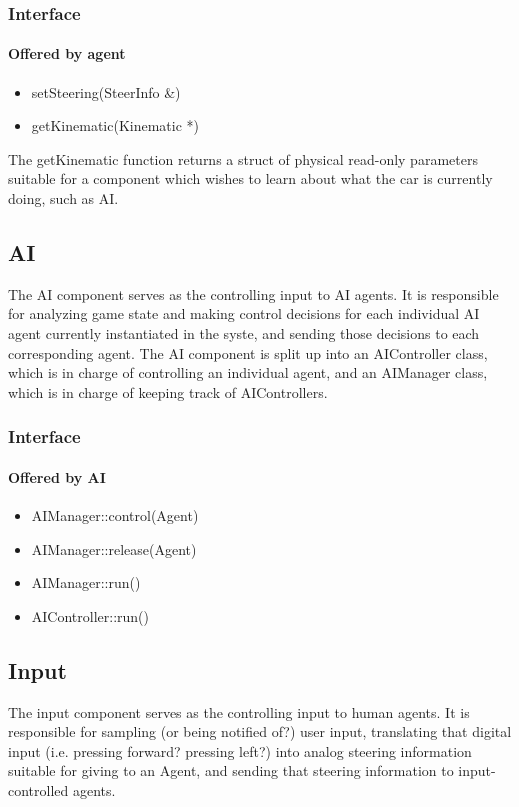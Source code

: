 \documentclass[12pt]{article}
\begin{document}
\subsubsection{Interface}

\paragraph{Offered by agent}
\begin{itemize}
\item setSteering(SteerInfo &)
\item getKinematic(Kinematic *)
\end{itemize}
The getKinematic function returns a struct of physical read-only parameters
suitable for a component which wishes to learn about what the car is currently
doing, such as AI.

\subsection{AI}
The AI component serves as the controlling input to AI agents. It is responsible
for analyzing game state and making control decisions for each individual AI
agent currently instantiated in the syste, and sending those decisions to
each corresponding agent. The AI component is split up into an AIController
class, which is in charge of controlling an individual agent, and an AIManager
class, which is in charge of keeping track of AIControllers.

\subsubsection{Interface}

\paragraph{Offered by AI}
\begin{itemize}
\item AIManager::control(Agent)
\item AIManager::release(Agent)
\item AIManager::run()
\item AIController::run()
\end{itemize}

\subsection{Input}
The input component serves as the controlling input to human agents. It
is responsible for sampling (or being notified of?) user input, translating
that digital input (i.e. pressing forward? pressing left?) into analog
steering information suitable for giving to an Agent, and sending that steering
information to input-controlled agents.
\end{document}
